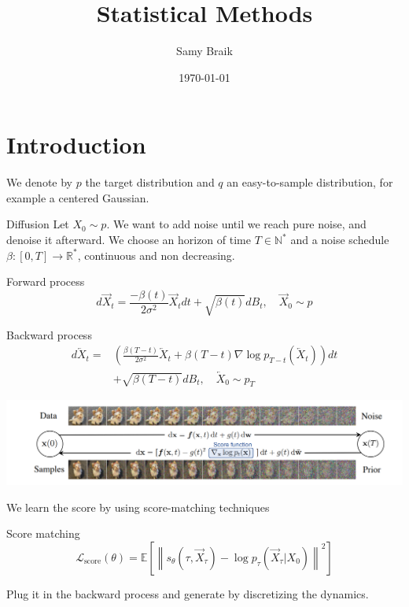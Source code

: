 \documentclass{beamer}
\title{Statistical Methods}
\author{Samy Braik}
\date{\today}
\begin{document}
\begin{frame}
    \titlepage
\end{frame}

\section{Introduction}

\begin{frame}
    We denote by \(p\) the target distribution and \(q\) an easy-to-sample distribution, for example a centered Gaussian.
\end{frame}

\begin{frame}{Diffusion}
    Let \(X_0\sim p\). We want to add noise until we reach pure noise, and denoise it afterward. We choose an horizon of time \(T\in\mathbb{N}^*\) and a noise schedule \(\beta:[0,T]\rightarrow\mathbb{R}^*\), continuous and non decreasing.

    \begin{block}{Forward process}
            \[d\overrightarrow{X}_t = \frac{-\beta(t)}{2\sigma^2}\overrightarrow{X}_t dt + \sqrt{\beta(t)}dB_t, \quad \overrightarrow{X}_0\sim p\]
    \end{block}

    \begin{block}{Backward process}
        \begin{align*}
            d\overleftarrow{X}_t=&\left(  \frac{\beta(T-t)}{2\sigma^2}\overleftarrow{X}_t+\beta(T-t)\nabla\log p_{T-t}\left(\overleftarrow{X}_t \right)  \right)dt \\ &+ \sqrt{\beta(T-t)}dB_t, \quad \overleftarrow{X}_0\sim p_T
        \end{align*}
            
    \end{block}
\end{frame}

\begin{frame}
    \includegraphics[width=1\linewidth]{score_based_dog.png}
    \bigskip

    We learn the score by using score-matching techniques
    \begin{block}{Score matching}
        \[\mathcal{L}_\text{score}(\theta)=\mathbb{E}\left[ \left\| s_\theta \left(\tau,\overrightarrow{X}_\tau \right)-\log p_\tau \left(\overrightarrow{X}_\tau|X_0 \right)\right\|^2  \right]   \]
    \end{block}
    Plug it in the backward process and generate by discretizing the dynamics.
\end{frame}
\end{document}
